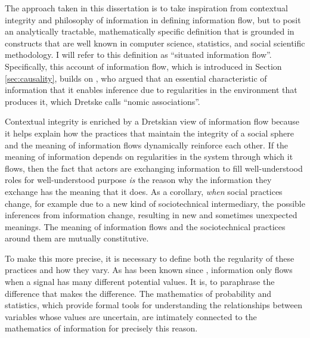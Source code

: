 \documentclass[../thesis.tex]{subfiles}
\begin{document}
 The approach taken in this dissertation is to take inspiration
 from contextual integrity and philosophy of information
 in defining information flow, but
 to posit an analytically tractable, mathematically specific
 definition that is grounded in constructs that are well known
 in computer science, statistics, and social scientific methodology.
 I will refer to this definition as ``situated information flow''.
 Specifically, this account of information flow, which is introduced
 in Section \ref{sec:causality},
 builds on \citet{dretske1981knowledge}, who argued that an
 essential characteristic of information that
 it enables inference due to regularities in the environment
 that produces it, which Dretske calls ``nomic associations''.

 Contextual integrity is enriched by a Dretskian view of
 information flow because it helps explain how the practices
 that maintain the integrity of a social sphere and the
 meaning of information flows dynamically reinforce each
 other.
 If the meaning of information depends on regularities in
 the system through which it flows, then the fact that
 actors are exchanging information to fill well-understood
 roles for well-understood purpose \textit{is} the reason why
 the information they exchange has the meaning that it does.
 As a corollary, \textit{when} social practices change, for
 example due to a new kind of sociotechnical intermediary,
 the possible inferences from information change, resulting
 in new and sometimes unexpected meanings.
 The meaning of information flows and the sociotechnical
 practices around them are mutually constitutive.

 To make this more precise, it is necessary to define both
 the regularity of these practices and how they vary.
 As has been known since \citet{shannon1948mathematical},
 information only flows when a signal has many different
 potential values. It is, to paraphrase \citet{bateson1972steps}
 the difference that makes the difference.
 The mathematics of probability and statistics, which provide
 formal tools for understanding the relationships between variables
 whose values are uncertain, are intimately connected to the
 mathematics of information for precisely this reason.
\end{document}
